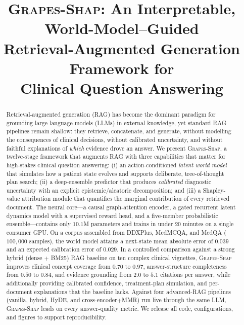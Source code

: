\documentclass[conference]{IEEEtran}
\newcommand{\method}{\textsc{Grapes-Shap}}
\begin{document}
\title{\method: An Interpretable, World-Model--Guided\\
Retrieval-Augmented Generation Framework for\\
Clinical Question Answering}

\author{
}

\maketitle

\begin{abstract}
Retrieval-augmented generation (RAG) has become the dominant paradigm for
grounding large language models (LLMs) in external knowledge, yet standard
RAG pipelines remain shallow: they retrieve, concatenate, and generate,
without modelling the consequences of clinical decisions, without
calibrated uncertainty, and without faithful explanations of \emph{which}
evidence drove an answer. We present \method, a twelve-stage framework that
augments RAG with three capabilities that matter for high-stakes clinical
question answering: (i) an action-conditioned \emph{latent world model} that
simulates how a patient state evolves and supports deliberate, tree-of-thought
plan search; (ii) a deep-ensemble predictor that produces \emph{calibrated}
diagnostic uncertainty with an explicit epistemic/aleatoric decomposition;
and (iii) a Shapley-value attribution module that quantifies the marginal
contribution of every retrieved document. The neural core---a causal
graph-attention encoder, a gated recurrent latent dynamics model with a
supervised reward head, and a five-member probabilistic ensemble---contains
only $10.1$M parameters and trains in under $20$ minutes on a single consumer
GPU. On a corpus assembled from DDXPlus, MedMCQA, and MedQA
($100{,}000$ samples), the world model attains a next-state mean absolute
error of $0.039$ and an expected calibration error of $0.029$.
In a controlled comparison against a strong hybrid (dense $+$ BM25) RAG
baseline on ten complex clinical vignettes, \method{} improves clinical
concept coverage from $0.70$ to $0.97$, answer-structure completeness from
$0.50$ to $0.84$, and evidence grounding from $2.0$ to $5.1$ citations per
answer, while additionally providing calibrated confidence, treatment-plan
simulation, and per-document explanations that the baseline lacks. Against four
advanced-RAG pipelines (vanilla, hybrid, HyDE, and cross-encoder$+$MMR) run live
through the same LLM, \method{} leads on every answer-quality metric. We release
all code, configurations, and figures to support reproducibility.
\end{abstract}
\end{document}
